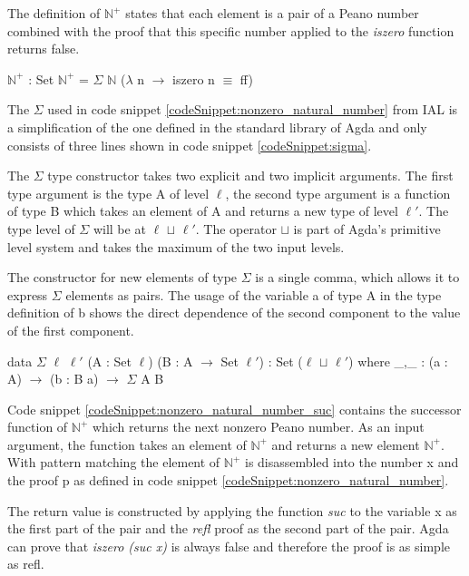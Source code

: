 The definition of $\mathbb{N}^+$ states that each element is a pair of a Peano number combined with the proof that this specific number applied to the \emph{iszero} function returns false.

\begin{codesnippet}[mathescape=true, caption={Definition of nonzero Peano numbers in Agda}, label={codeSnippet:nonzero_natural_number}]
$\mathbb{N}^+$ : Set
$\mathbb{N}^+$ = $\Sigma$ $\mathbb{N}$ ($\lambda$ n $\rightarrow$ iszero n $\equiv$ ff)
\end{codesnippet}

The $\Sigma$ used in code snippet \ref{codeSnippet:nonzero_natural_number} from IAL is a simplification of the one defined in the standard library of Agda and only consists of three lines shown in code snippet \ref{codeSnippet:sigma}.

The $\Sigma$ type constructor takes two explicit and two implicit arguments. 
The first type argument is the type A of level $\ell$, the second type argument is a function of type B which takes an element of A and returns a new type of level $\ell '$.
The type level of $\Sigma$ will be at $\ell$ $\sqcup$ $\ell '$. The operator $\sqcup$ is part of Agda's primitive level system and takes the maximum of the two input levels.

The constructor for new elements of type $\Sigma$ is a single comma, which allows it to express $\Sigma$ elements as pairs.
The  usage of the variable a of type A in the type definition of b shows the direct dependence of the second component to the value of the first component.

\begin{codesnippet}[mathescape=true, caption={Definition of $\Sigma$ in Agda}, label={codeSnippet:sigma}]
data $\Sigma$ {$\ell$ $\ell '$} (A : Set $\ell$) (B : A $\rightarrow$ Set $\ell '$)
 : Set ($\ell$ $\sqcup$ $\ell '$) where
_,_ : (a : A) $\rightarrow$ (b : B a) $\rightarrow$ $\Sigma$ A B
\end{codesnippet}

Code snippet \ref{codeSnippet:nonzero_natural_number_suc} contains the successor function of $\mathbb{N}^+$ which returns the next nonzero Peano number.
As an input argument, the function takes an element of $\mathbb{N}^+$ and returns a new element $\mathbb{N}^+$. 
With pattern matching the element of $\mathbb{N}^+$ is disassembled into the number x and the proof p as defined in code snippet \ref{codeSnippet:nonzero_natural_number}.

The return value is constructed by applying the function \emph{suc} to the variable x as the first part of the pair and the \emph{refl} proof as the second part of the pair.
Agda can prove that \emph{iszero (suc x)} is always false and therefore the proof is as simple as refl.

